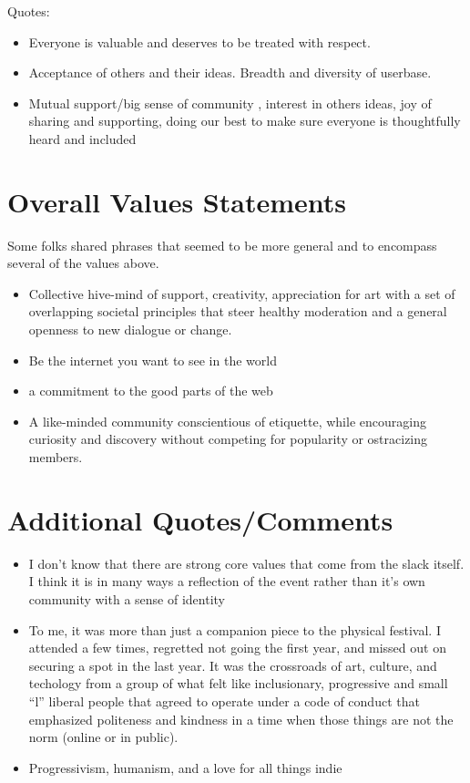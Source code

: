 \documentclass[
]{book}
\providecommand{\tightlist}{%
  \setlength{\itemsep}{0pt}\setlength{\parskip}{0pt}}
\begin{document}
Quotes:

\begin{itemize}
\tightlist
\item
  Everyone is valuable and deserves to be treated with respect.\\
\item
  Acceptance of others and their ideas. Breadth and diversity of userbase.
\item
  Mutual support/big sense of community , interest in others ideas, joy of sharing and supporting, doing our best to make sure everyone is thoughtfully heard and included
\end{itemize}

\section{Overall Values Statements}\label{overall-values-statements}

Some folks shared phrases that seemed to be more general and to encompass several of the values above.

\begin{itemize}
\tightlist
\item
  Collective hive-mind of support, creativity, appreciation for art with a set of overlapping societal principles that steer healthy moderation and a general openness to new dialogue or change.
\item
  Be the internet you want to see in the world
\item
  a commitment to the good parts of the web
\item
  A like-minded community conscientious of etiquette, while encouraging curiosity and discovery without competing for popularity or ostracizing members.
\end{itemize}

\section{Additional Quotes/Comments}\label{additional-quotescomments}

\begin{itemize}
\tightlist
\item
  I don't know that there are strong core values that come from the slack itself. I think it is in many ways a reflection of the event rather than it's own community with a sense of identity
\item
  To me, it was more than just a companion piece to the physical festival. I attended a few times, regretted not going the first year, and missed out on securing a spot in the last year. It was the crossroads of art, culture, and techology from a group of what felt like inclusionary, progressive and small ``l'' liberal people that agreed to operate under a code of conduct that emphasized politeness and kindness in a time when those things are not the norm (online or in public).
\item
  Progressivism, humanism, and a love for all things indie
\end{itemize}
\end{document}
